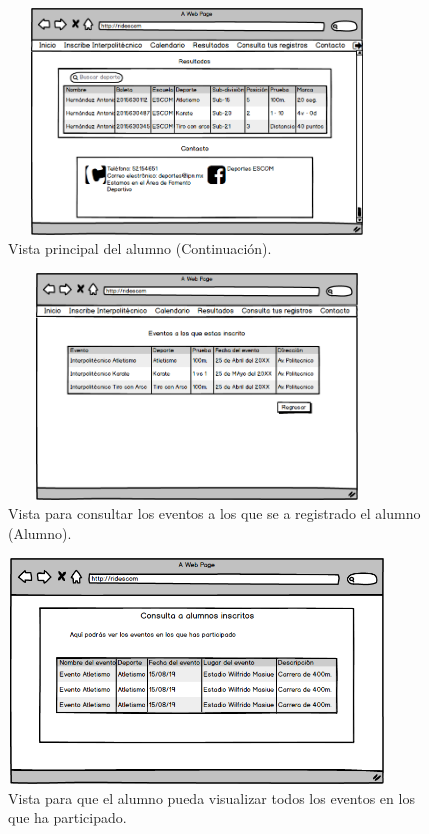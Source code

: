 		\begin{figure} [hbt!]
			\centering
			\includegraphics[width=10cm, height=6cm]{Imagenes/Nuevos/P19_Inicio_paticipante1}
			\caption{Vista principal del alumno (Continuación).}
			\label{principalalum1}
		\end{figure}
	
		\begin{figure} [hbt!]
			\centering
			\includegraphics[width=10cm, height=6cm]{Imagenes/Nuevos/P20_Consulta_Inscripciones}
			\caption{Vista para consultar los eventos a los que se a registrado el alumno (Alumno).}
			\label{consultainscripcion}
		\end{figure}
	\pagebreak
		
		\begin{figure} [hbt!]
			\centering
			\includegraphics[width=10cm, height=6cm]{Imagenes/Nuevos/P21_Historial}
			\caption{Vista para que el alumno pueda visualizar todos los eventos en los que ha participado.}
			\label{historial}
		\end{figure}

